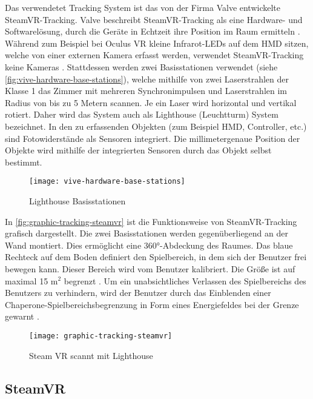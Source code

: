Das verwendetet Tracking System ist das von der Firma Valve entwickelte SteamVR-Tracking. Valve beschreibt SteamVR-Tracking als eine Hardware- und Softwarelösung, durch die Geräte in Echtzeit ihre Position im Raum ermitteln \cite{Valve.2020}. Während zum Beispiel bei Oculus VR kleine Infrarot-LEDs auf dem \ac{HMD} sitzen, welche von einer externen Kamera erfasst werden, verwendet SteamVR-Tracking keine Kameras \cite{Sauter.2015}. Stattdessen werden zwei Basisstationen verwendet (siehe \autoref{fig:vive-hardware-base-stations}), welche mithilfe von zwei Laserstrahlen der Klasse 1 \glqq das Zimmer mit mehreren Synchronimpulsen und Laserstrahlen im Radius von bis zu 5 Metern\grqq \cite{Valve.2020} scannen. Je ein Laser wird horizontal und vertikal rotiert. Daher wird das System auch als Lighthouse (Leuchtturm) System bezeichnet. In den zu erfassenden Objekten (zum Beispiel \ac{HMD}, Controller, etc.) sind Fotowiderstände als Sensoren integriert. Die millimetergenaue Position der Objekte wird mithilfe der integrierten Sensoren durch das Objekt selbst bestimmt. \cite{Yates.20160512}

\begin{figure}[!htbp]
	\centering
	\texttt{[image: vive-hardware-base-stations]}
	\caption[Lighthouse Basisstationen]{Lighthouse Basisstationen \cite{ViveBaseStation}}
	\label{fig:vive-hardware-base-stations}
\end{figure}

In \autoref{fig:graphic-tracking-steamvr} ist die Funktionsweise von SteamVR-Tracking grafisch dargestellt. Die zwei Basisstationen werden gegenüberliegend an der Wand montiert. Dies ermöglicht eine 360°-Abdeckung des Raumes. Das blaue Rechteck auf dem Boden definiert den Spielbereich, in dem sich der Benutzer frei bewegen kann. Dieser Bereich wird vom Benutzer kalibriert. Die Größe ist auf maximal 15 m$^2$ begrenzt \cite{ViveProduct}. Um ein unabsichtliches Verlassen des Spielbereichs des Benutzers zu verhindern, wird der Benutzer durch das Einblenden einer Chaperone-Spielbereichsbegrenzung in Form eines Energiefeldes bei der Grenze gewarnt \cite{ViveProduct}. 

\begin{figure}[!htbp]
	\centering
	\texttt{[image: graphic-tracking-steamvr]}
	\caption[Steam VR scannt mit Lighthouse]{Steam VR scannt mit Lighthouse \cite{Sauter.2015}}
	\label{fig:graphic-tracking-steamvr}
\end{figure}

\subsection{SteamVR}

